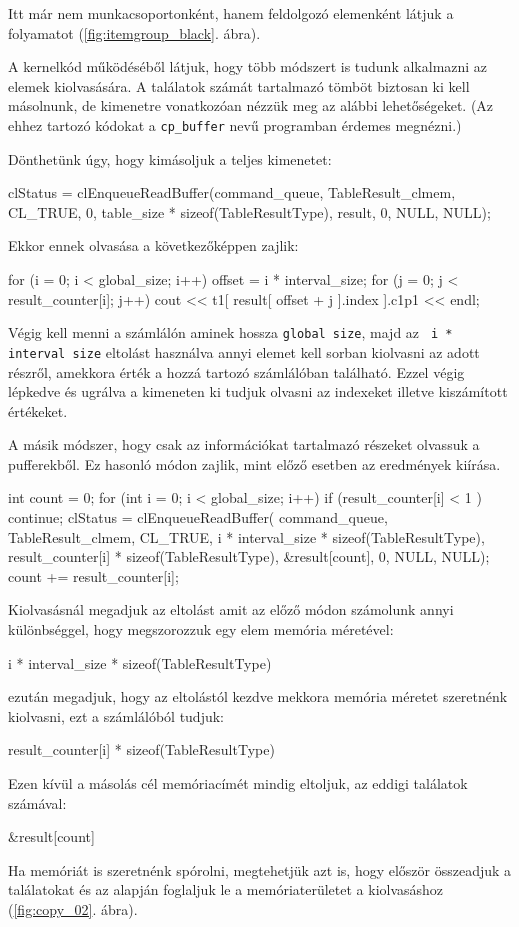 Itt már nem munkacsoportonként, hanem feldolgozó elemenként látjuk a folyamatot (\ref{fig:itemgroup_black}. ábra).


A kernelkód működéséből látjuk, hogy több módszert is tudunk alkalmazni az elemek kiolvasására. A találatok számát tartalmazó tömböt biztosan ki kell másolnunk, de kimenetre vonatkozóan nézzük meg az alábbi lehetőségeket. (Az ehhez tartozó kódokat a \texttt{cp\_buffer} nevű programban érdemes megnézni.)


Dönthetünk úgy, hogy kimásoljuk a teljes kimenetet:
\begin{python}
clStatus = clEnqueueReadBuffer(command_queue, TableResult_clmem, 
    CL_TRUE, 0, table_size * sizeof(TableResultType), result, 
    0, NULL, NULL);
\end{python}
Ekkor ennek olvasása a következőképpen zajlik:
\begin{python}
for (i = 0; i < global_size; i++)
{
    offset = i * interval_size;
    for (j = 0; j < result_counter[i]; j++)
        cout << t1[ result[ offset + j ].index ].c1p1 << endl;
}
\end{python}
Végig kell menni a számlálón aminek hossza \texttt{global size}, majd az \texttt{ i * interval size} eltolást használva annyi elemet kell sorban kiolvasni az adott részről, amekkora érték a hozzá tartozó számlálóban található. Ezzel végig lépkedve és ugrálva a kimeneten ki tudjuk olvasni az indexeket illetve kiszámított értékeket.


A másik módszer, hogy csak az információkat tartalmazó részeket olvassuk a pufferekből. Ez hasonló módon zajlik, mint előző esetben az eredmények kiírása.
\begin{python}
int count = 0;
for (int i = 0; i < global_size; i++)
{
    if (result_counter[i] < 1 ) continue; 
    clStatus = clEnqueueReadBuffer(
    command_queue, TableResult_clmem, CL_TRUE, 
	i * interval_size * sizeof(TableResultType),
	result_counter[i] * sizeof(TableResultType), 
	&result[count], 0, NULL, NULL);
	count += result_counter[i];
}
\end{python}

Kiolvasásnál megadjuk az eltolást amit az előző módon számolunk annyi különbséggel, hogy megszorozzuk egy elem memória méretével:
\begin{python}
i * interval\_size * sizeof(TableResultType)
\end{python}
ezután megadjuk, hogy az eltolástól kezdve mekkora memória méretet szeretnénk kiolvasni, ezt a számlálóból tudjuk: 
\begin{python}
result\_counter[i] * sizeof(TableResultType)
\end{python}
Ezen kívül a másolás cél memóriacímét mindig eltoljuk, az eddigi találatok számával:
\begin{python}
&result[count]
\end{python}
Ha memóriát is szeretnénk spórolni, megtehetjük azt is, hogy először összeadjuk a találatokat és az alapján foglaljuk le a memóriaterületet a kiolvasáshoz (\ref{fig:copy_02}. ábra).

